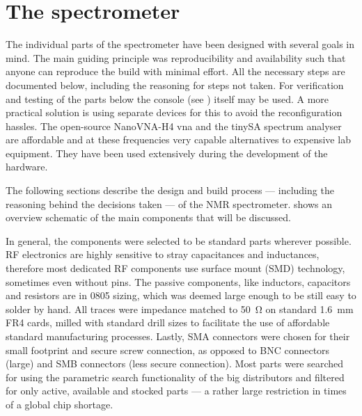 
\chapter{The spectrometer}

The individual parts of the spectrometer have been designed with several goals in mind. The main guiding principle was reproducibility and availability such that anyone can reproduce the build with minimal effort. All the necessary steps are documented below, including the reasoning for steps not taken. For verification and testing of the parts below the console (see ) itself may be used. A more practical solution is using separate devices for this to avoid the reconfiguration hassles. The open-source NanoVNA-H4 \acrshort{vna} and the tinySA spectrum analyser are affordable and at these frequencies very capable alternatives to expensive lab equipment. They have been used extensively during the development of the hardware.

The following sections describe the design and build process --- including the reasoning behind the decisions taken --- of the \magnethical{} NMR spectrometer.  shows an overview schematic of the main components that will be discussed.

In general, the components were selected to be standard parts wherever possible. RF electronics are highly sensitive to stray capacitances and inductances, therefore most dedicated RF components use surface mount (SMD) technology, sometimes even without pins. The passive components, like inductors, capacitors and resistors are in 0805 sizing, which was deemed large enough to be still easy to solder by hand. All traces were impedance matched to \qty{50}{\ohm} on standard \qty{1.6}{\milli\metre} FR4 cards, milled with standard drill sizes to facilitate the use of affordable standard manufacturing processes. Lastly, SMA connectors were chosen for their small footprint and secure screw connection, as opposed to BNC connectors (large) and SMB connectors (less secure connection). Most parts were searched for using the parametric search functionality of the big distributors and filtered for only active, available and stocked parts --- a rather large restriction in times of a global chip shortage.

